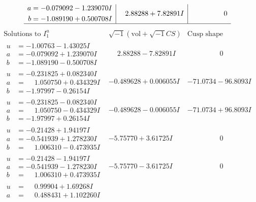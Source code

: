 \documentclass[1p]{elsarticle_modified}
\theoremstyle{definition}
\newcommand{\I}{\sqrt{-1}}
\begin{document}
$$\begin{array}{c|c|c}
\begin{aligned}
a &= -0.079092 - 1.239070 I \\
b &= -1.089190 + 0.500708 I\end{aligned}
 & \phantom{-}2.88288 + 7.82891 I & \phantom{-0.000000 } 0\\
 \hline 
 \end{array}$$\newpage$$\begin{array}{c|c|c}  
\text{Solutions to }I^u_{1}& \I (\text{vol} + \sqrt{-1}CS) & \text{Cusp shape}\\
 \hline 
\begin{aligned}
u &= -1.00763 - 1.43025 I \\
a &= -0.079092 + 1.239070 I \\
b &= -1.089190 - 0.500708 I\end{aligned}
 & \phantom{-}2.88288 - 7.82891 I & \phantom{-0.000000 } 0 \\ \hline\begin{aligned}
u &= -0.231825 + 0.082340 I \\
a &= \phantom{-}1.050750 + 0.434329 I \\
b &= -1.97997 - 0.26154 I\end{aligned}
 & -0.489628 + 0.006055 I & -71.0734 - 96.8093 I \\ \hline\begin{aligned}
u &= -0.231825 - 0.082340 I \\
a &= \phantom{-}1.050750 - 0.434329 I \\
b &= -1.97997 + 0.26154 I\end{aligned}
 & -0.489628 - 0.006055 I & -71.0734 + 96.8093 I \\ \hline\begin{aligned}
u &= -0.21428 + 1.94197 I \\
a &= -0.541939 + 1.278230 I \\
b &= \phantom{-}1.006310 - 0.473935 I\end{aligned}
 & -5.75770 + 3.61725 I & \phantom{-0.000000 } 0 \\ \hline\begin{aligned}
u &= -0.21428 - 1.94197 I \\
a &= -0.541939 - 1.278230 I \\
b &= \phantom{-}1.006310 + 0.473935 I\end{aligned}
 & -5.75770 - 3.61725 I & \phantom{-0.000000 } 0 \\ \hline\begin{aligned}
u &= \phantom{-}0.99904 + 1.69268 I \\
a &= \phantom{-}0.488431 + 1.102260 I \\

\end{aligned}
\end{array}$$
\end{document}
